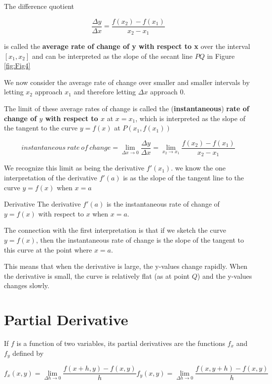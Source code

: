 \begin{flushleft}
The difference quotient

\begin{equation}
\label{eq:2}
\frac{\Delta y}{\Delta x} = \frac{f(x_2) - f(x_1)}{x_2 - x_1}
\end{equation}

is called the \textbf{average rate of change of y with respect to x} over the interval $[x_1, x_2]$ and can be interpreted as the slope of the secant line $PQ$ in Figure \ref{fig:Fig4}

We now consider the average rate of change over smaller and smaller intervals by letting $x_2$ approach $x_1$ and therefore letting $\Delta x$ approach 0.

The limit of these average rates of change is called the (\textbf{instantaneous}) \textbf{rate of change of $y$ with respect to $x$} at $x = x_1$, which is interpreted as the slope of the tangent to the curve $y = f(x)$ at $P(x_1, f(x_1))$
\end{flushleft}

\begin{equation}
\label{eq:3}
instantaneous\ rate\ of\ change = \lim_{\Delta x \to 0} \frac{\Delta y}{\Delta x} = \lim_{x_2 \to x_1} \frac{f(x_2) - f(x_1)}{x_2 - x_1}
\end{equation}

\begin{flushleft}
We recognize this limit as being the derivative $f'(x_1)$.
we know the one interpretation of the derivative $f'(a)$ is as the slope of the tangent line to the curve $y=f(x)$ when $x=a$
\end{flushleft}

\begin{mybox}{Derivative}
The derivative $f'(a)$ is the instantaneous rate of change of $y=f(x)$ with respect to $x$ when $x = a$.
\end{mybox}

\begin{flushleft}
The connection with the first interpretation is that if we sketch the curve $y = f(x)$, then the instantaneous rate of change is the slope of the tangent to this curve at the point where $x = a$.

This means that when the derivative is large, the y-values change rapidly. When the derivative is small, the curve is relatively flat (as at point $Q$) and the y-values changes slowly.
\end{flushleft}

\section{Partial Derivative}
\begin{definition}
If $f$ is a function of two variables, its partial derivatives are the functions $f_x$ and $f_y$ defined by
\end{definition}
\begin{equation}
    \label{eq:7}
    f_x(x, y) = \lim_{\Delta h \to 0} \frac{f(x+h, y)-f(x, y)}{h}
    f_y(x, y) = \lim_{\Delta h \to 0} \frac{f(x, y + h)-f(x, y)}{h}
\end{equation}

